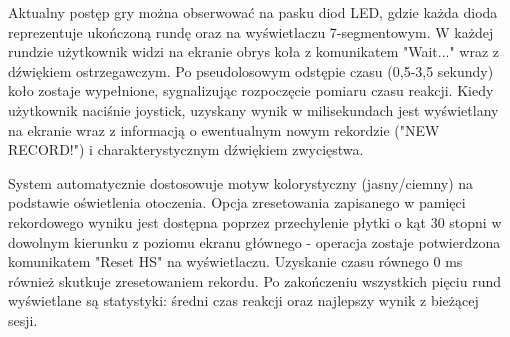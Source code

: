 \documentclass[letterpaper,11pt]{report}
\begin{document}
Aktualny postęp gry można obserwować na pasku diod LED, gdzie każda dioda reprezentuje ukończoną rundę oraz na wyświetlaczu 7-segmentowym. W każdej rundzie użytkownik widzi na ekranie obrys koła z komunikatem "Wait..." wraz z dźwiękiem ostrzegawczym. Po pseudolosowym odstępie czasu (0,5-3,5 sekundy) koło zostaje wypełnione, sygnalizując rozpoczęcie pomiaru czasu reakcji. Kiedy użytkownik naciśnie joystick, uzyskany wynik w milisekundach jest wyświetlany na ekranie wraz z informacją o ewentualnym nowym rekordzie ("NEW RECORD!") i charakterystycznym dźwiękiem zwycięstwa.

System automatycznie dostosowuje motyw kolorystyczny (jasny/ciemny) na podstawie oświetlenia otoczenia. Opcja zresetowania zapisanego w pamięci rekordowego wyniku jest dostępna poprzez przechylenie płytki o kąt 30 stopni w dowolnym kierunku z poziomu ekranu głównego - operacja zostaje potwierdzona komunikatem "Reset HS" na wyświetlaczu. Uzyskanie czasu równego 0 ms również skutkuje zresetowaniem rekordu. Po zakończeniu wszystkich pięciu rund wyświetlane są statystyki: średni czas reakcji oraz najlepszy wynik z bieżącej sesji.
\end{document}
